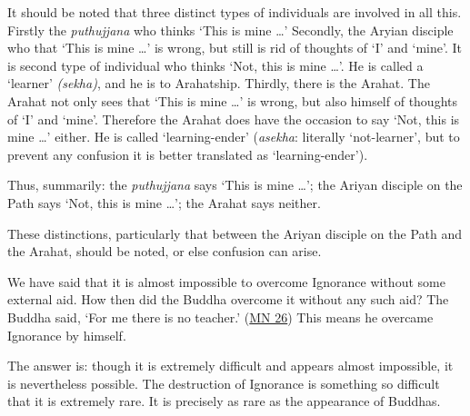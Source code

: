 It should be noted that three distinct types of individuals are involved in all this. Firstly the \emph{puthujjana} who thinks `This is mine \ldots\hspace{0pt}' Secondly, the Aryian disciple who  that `This is mine \ldots\hspace{0pt}' is wrong, but still is  rid of thoughts of `I' and `mine'. It is  second type of individual who thinks `Not, this is mine \ldots\hspace{0pt}'. He is called a `learner' \emph{(sekha)}, and he is  to Arahatship. Thirdly, there is the Arahat. The Arahat not only sees that `This is mine \ldots\hspace{0pt}' is wrong, but also  himself of thoughts of `I' and `mine'. Therefore the Arahat does  have the occasion to say `Not, this is mine \ldots\hspace{0pt}' either. He is called `learning-ender' (\emph{asekha}: literally `not-learner', but to prevent any confusion it is better translated as `learning-ender').

Thus, summarily: the \emph{puthujjana} says `This is mine \ldots\hspace{0pt}'; the Ariyan disciple on the Path says `Not, this is mine \ldots\hspace{0pt}'; the Arahat says neither.

These distinctions, particularly that between the Ariyan disciple on the Path and the Arahat, should be noted, or else confusion can arise.

We have said that it is almost impossible to overcome Ignorance without some external aid. How then did the Buddha overcome it without any such aid? The Buddha said, `For me there is no teacher.' (\href{https://suttacentral.net/mn26/en/bodhi}{MN 26}) This means he overcame Ignorance by himself.

The answer is: though it is extremely difficult and appears almost impossible, it is nevertheless possible. The destruction of Ignorance  is something so difficult that it is extremely rare. It is precisely as rare as the appearance of Buddhas.
